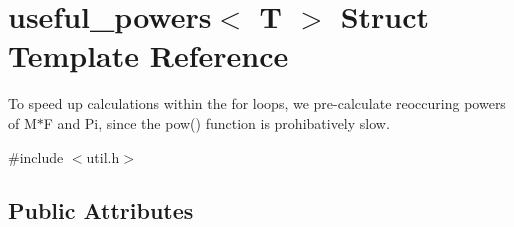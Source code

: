 \hypertarget{structuseful__powers}{}\section{useful\+\_\+powers$<$ T $>$ Struct Template Reference}
\label{structuseful__powers}


To speed up calculations within the for loops, we pre-\/calculate reoccuring powers of M$\ast$F and Pi, since the pow() function is prohibatively slow.  




{\ttfamily \#include $<$util.\+h$>$}

\subsection*{Public Attributes}
